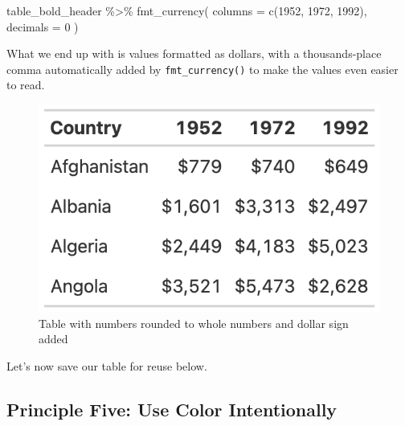 \documentclass[
]{book}
\newenvironment{Shaded}{\begin{snugshade}}{\end{snugshade}}
\newcommand{\AttributeTok}[1]{\textcolor[rgb]{0.77,0.63,0.00}{#1}}
\newcommand{\DecValTok}[1]{\textcolor[rgb]{0.00,0.00,0.81}{#1}}
\newcommand{\FunctionTok}[1]{\textcolor[rgb]{0.00,0.00,0.00}{#1}}
\newcommand{\NormalTok}[1]{#1}
\newcommand{\SpecialCharTok}[1]{\textcolor[rgb]{0.00,0.00,0.00}{#1}}
\newcommand{\StringTok}[1]{\textcolor[rgb]{0.31,0.60,0.02}{#1}}
\begin{document}
\begin{Shaded}
\begin{Highlighting}[]
\NormalTok{table\_bold\_header }\SpecialCharTok{\%\textgreater{}\%}
  \FunctionTok{fmt\_currency}\NormalTok{(}
    \AttributeTok{columns =} \FunctionTok{c}\NormalTok{(}\StringTok{\textasciigrave{}}\AttributeTok{1952}\StringTok{\textasciigrave{}}\NormalTok{, }\StringTok{\textasciigrave{}}\AttributeTok{1972}\StringTok{\textasciigrave{}}\NormalTok{, }\StringTok{\textasciigrave{}}\AttributeTok{1992}\StringTok{\textasciigrave{}}\NormalTok{),}
    \AttributeTok{decimals =} \DecValTok{0}
\NormalTok{  ) }
\end{Highlighting}
\end{Shaded}

What we end up with is values formatted as dollars, with a thousands-place comma automatically added by \texttt{fmt\_currency()} to make the values even easier to read.

\begin{figure}
\includegraphics[width=1\linewidth]{nostarch/temp/F05009} \caption{Table with numbers rounded to whole numbers and dollar sign added}\label{fig:unnamed-chunk-31}
\end{figure}

Let's now save our table for reuse below.

\hypertarget{principle-five-use-color-intentionally}{%
\subsection*{Principle Five: Use Color Intentionally}\label{principle-five-use-color-intentionally}}
\end{document}
